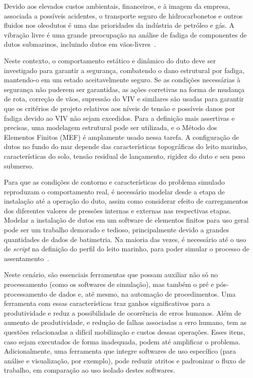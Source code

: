 Devido aos elevados custos ambientais, financeiros, e à imagem da empresa, associada a possíveis acidentes, o transporte seguro de hidrocarbonetos e outros fluidos nos oleodutos é uma das prioridades da indústria de petróleo e gás.
A vibração livre é uma grande preocupação na análise de fadiga de componentes de dutos submarinos, incluindo dutos em vãos-livres~\cite{Gamino2013}.

Neste contexto, o comportamento estático e dinâmico do duto deve ser investigado para garantir a segurança, combatendo o dano estrutural por fadiga, mantendo-o em um estado aceitavelmente seguro.
Se as condições necessárias à segurança não puderem ser garantidas, as ações corretivas na forma de mudança de rota, correção de vãos, supressão do VIV e similares são usadas para garantir que os critérios de projeto relativos aos níveis de tensão e possíveis danos por fadiga devido ao VIV não sejam excedidos.
Para a definição mais assertivas e precisas, uma modelagem estrutural pode ser utilizada, e o Método dos Elementos Finitos (MEF) é amplamente usado nessa tarefa.
A configuração de dutos no fundo do mar depende das características topográficas do leito marinho, características do solo, tensão residual de lançamento, rigidez do duto e seu peso submerso.

Para que as condições de contorno e características do problema simulado reproduzam o comportamento real, é necessário modelar desde a etapa de instalação até a operação do duto, assim como considerar efeito de carregamentos dos diferentes valores de pressões internas e externas nas respectivas etapas.
Modelar a instalação de dutos em um software de elementos finitos para uso geral pode ser um trabalho demorado e tedioso, principalmente devido a grandes quantidades de dados de batimetria.
Na maioria das vezes, é necessário até o uso de \textit{script} na definição do perfil do leito marinho, para poder simular o processo de assentamento~\cite{VandenAbeele2013}.

Neste cenário, são essenciais ferramentas que possam auxiliar não só no processamento (como os softwares de simulação), mas também o pré e pós-processamento de dados e, até mesmo, na automação de procedimentos.
Uma ferramenta com essas características traz ganhos significativos para a produtividade e reduz a possibilidade de ocorrência de erros humanos.
Além de aumento de produtividade, e redução de falhas associadas a erro humano, tem as questões relacionadas a difícil mobilização e custos dessas operações. Esses itens, caso sejam executados de forma inadequada, podem até amplificar o problema.
Adicionalmente, uma ferramenta que integre softwares de uso específico (para análise e visualização, por exemplo), pode reduzir atritos e padronizar o fluxo de trabalho, em comparação ao uso isolado destes softwares.


